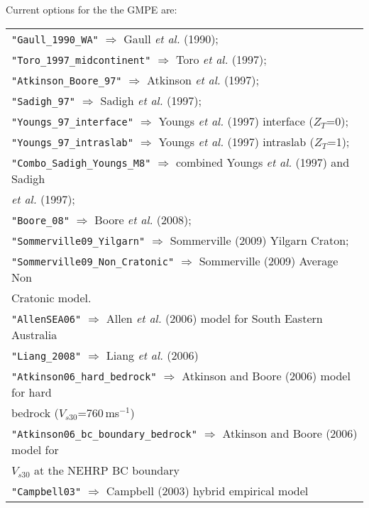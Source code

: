 Current options for the the GMPE are: \\
\vspace{1em}
\begin{tabular}{|p{\textwidth}|}
\hline
\texttt{"Gaull\_1990\_WA"} $\Rightarrow$ Gaull \textit{et al.} (1990); \\
\texttt{"Toro\_1997\_midcontinent"}  $\Rightarrow$ Toro \textit{et al.} (1997); \\
\texttt{"Atkinson\_Boore\_97"}  $\Rightarrow$ Atkinson \textit{et al.} (1997); \\
\texttt{"Sadigh\_97"}  $\Rightarrow$ Sadigh \textit{et al.} (1997); \\
\texttt{"Youngs\_97\_interface"}  $\Rightarrow$ Youngs \textit{et al.} (1997) interface ($Z_T$=0); \\
\texttt{"Youngs\_97\_intraslab"}  $\Rightarrow$ Youngs \textit{et al.} (1997) intraslab ($Z_T$=1); \\
\texttt{"Combo\_Sadigh\_Youngs\_M8"}  $\Rightarrow$ combined Youngs \textit{et al.} (1997) and Sadigh \\
\hspace{8em} \textit{et al.} (1997); \\
\texttt{"Boore\_08"}  $\Rightarrow$ Boore \textit{et al.} (2008); \\
\texttt{"Sommerville09\_Yilgarn"} $\Rightarrow$ Sommerville (2009) Yilgarn Craton; \\
\texttt{"Sommerville09\_Non\_Cratonic"} $\Rightarrow$ Sommerville (2009) Average Non \\
\hspace{8em} Cratonic model. \\
\texttt{"AllenSEA06"} $\Rightarrow$ Allen \textit{et al.} (2006) model for South Eastern Australia \\
\texttt{"Liang\_2008"} $\Rightarrow$ Liang \textit{et al.} (2006) \\
\texttt{"Atkinson06\_hard\_bedrock"} $\Rightarrow$ Atkinson and Boore (2006) model for hard \\
\hspace{8em} bedrock ($V_{s30}$=760\,ms$^{-1}$)\\
\texttt{"Atkinson06\_bc\_boundary\_bedrock"} $\Rightarrow$ Atkinson and Boore (2006) model for \\
\hspace{8em} $V_{s30}$ at the NEHRP BC boundary\\
\texttt{"Campbell03"} $\Rightarrow$ Campbell (2003) hybrid empirical model\\

\end{tabular}
